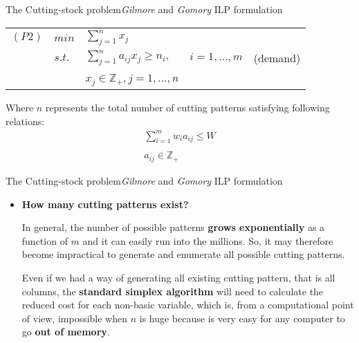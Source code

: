 \documentclass[10pt]{beamer}
\begin{document}
\begin{frame}{The Cutting-stock problem}{\textit{Gilmore} and \textit{Gomory} ILP formulation}
\begin{tabular}{lllrr}

$(P2)$ & $min$ & $\displaystyle\sum_{j = 1}^{n} x_j$ && \\
& $s.t.$ & $\displaystyle\sum_{j = 1}^{n} a_{ij} x_j \geq n_i,$ & $i = 1,...,m$ & (demand) \\\\

& & $x_j \in \mathbb{Z}_{+}, j = 1,...,n $ &&
\end{tabular}

\vspace{5mm}
Where $n$ represents the total number of cutting patterns satisfying following relations:
\begin{equation}
\begin{array} {c} 
\displaystyle\sum_{i=1}^m w_i a_{ij} \leq W \\\\ a_{ij} \in \mathbb{Z}_{+}
\end{array}
\end{equation}

\end{frame}

\begin{frame}{The Cutting-stock problem}{\textit{Gilmore} and \textit{Gomory} ILP formulation}

\begin{itemize}
\item \textbf{How many cutting patterns exist?}

\vspace{5mm}
In general, the number of possible patterns \textbf{grows exponentially} as a function of $m$ and it can easily run into the millions. So, it may therefore become impractical to generate and enumerate all possible cutting patterns. 

\vspace{5mm}
Even if we had a way of generating all existing cutting pattern, that is all columns, the \textbf{standard simplex algorithm} will need to calculate the reduced cost for each non-basic variable, which is, from a computational point of view, impossible when $n$ is huge because is very easy for any computer to go \textbf{out of memory}.
\end{itemize}

\end{frame}
\end{document}
